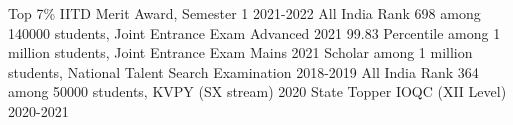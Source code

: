 



\begin{cvhonors}

    \cvhonor
    {Top 7\%} %
    {IITD Merit Award, Semester 1} %
    {2021-2022} %
    {}
  \cvhonor
    {All India Rank 698} %
    {among 140000 students, Joint Entrance Exam Advanced} %
    {2021} %
   {}
  \cvhonor
    {99.83 Percentile} %
    {among 1 million students, Joint Entrance Exam Mains} %
    {2021} %
    {}
  \cvhonor
    {Scholar} %
    {among 1 million students, National Talent Search Examination} %
    {2018-2019} %
    {}
  \cvhonor
    {All India Rank 364} %
    {among 50000 students, KVPY (SX stream)} %
    {2020} %
    {}
  \cvhonor
    {State Topper} %
    {IOQC (XII Level)} %
    {2020-2021} %
    {}
\end{cvhonors}




